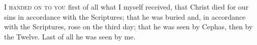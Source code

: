 
\lettrine{I}{ handed on to you} first of all what I myself received, that Christ died for our sins in accordance with the Scriptures; that he was buried and, in accordance with the Scriptures, rose on the third day; that he was seen by Cephas, then by the Twelve. Last of all he was seen by me.
